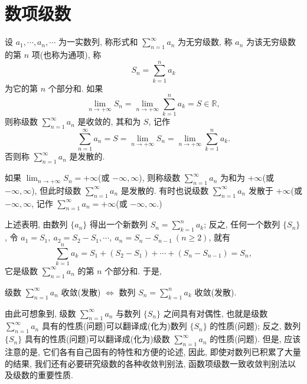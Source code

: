 \section{数项级数}\label{sec:12.1}

\begin{definition}[无穷级数与部分和]\label{def:12.1.1}
设 $a_{1}, \cdots, a_{n}, \cdots$ 为一实数列, 称形式和 $\sum_{n=1}^{\infty}a_{n}$ 为无穷级数, 称 $a_{n}$ 为该无穷级数的第 $n$ 项(也称为通项), 称
\[
  S_{n}=\sum_{k=1}^{n}a_{k}
\]
为它的第 $n$ 个部分和. 如果
\[
  \lim_{n\to+\infty}S_{n}=\lim_{n\to+\infty}\sum_{k=1}^{n}a_{k}=S\in\mathbb{R},
\]
则称级数 $\sum_{n=1}^{\infty}a_{n}$ 是收敛的, 其和为 $S$, 记作
\[
  \sum_{n=1}^{\infty}a_{n}=S=\lim_{n\to+\infty}S_{n}=\lim_{n\to+\infty}\sum_{k=1}^{n}a_{k}.
\]
否则称 $\sum_{n=1}^{\infty}a_{n}$ 是发散的.

如果 $\lim_{n\to+\infty}S_{n}=+\infty$(或 $-\infty,\infty$), 则称级数 $\sum_{n=1}^{\infty}a_{n}$ 为和为 $+\infty$(或 $-\infty,\infty$), 但此时级数 $\sum_{n=1}^{\infty}a_{n}$ 是发散的. 有时也说级数 $\sum_{n=1}^{\infty}a_{n}$ 发散于 $+\infty$(或 $-\infty,\infty$, 记作 $\sum_{n=1}^{\infty}a_{n}=+\infty$(或 $-\infty,\infty$.)
\end{definition}

上述表明, 由数列 $\{a_{n}\}$ 得出一个新数列 $S_{n}=\sum_{k=1}^{n}a_{k}$; 反之, 任何一个数列 $\{S_{n}\}$, 令 $a_{1}=S_{1},\ a_{2}=S_{2}-S_{1},\cdots,\ a_{n}=S_{n}-S_{n-1}\ (n\geqslant2)$, 就有
\[
  \sum_{k=1}^{n}a_{k}=S_{1}+(S_{2}-S_{1})+\cdots+(S_{n}-S_{n-1})=S_{n},
\]
它是级数 $\sum_{n=1}^{\infty}a_{n}$ 的第 $n$ 个部分和. 于是,
\begin{center}
级数 $\sum_{n=1}^{\infty}a_{n}$ 收敛(发散)
$\Leftrightarrow$ 数列 $S_{n}=\sum_{k=1}^{n}a_{k}$ 收敛(发散).
\end{center}

由此可想象到, 级数 $\sum_{n=1}^{\infty}a_{n}$ 与数列 $\{S_{n}\}$ 之间具有对偶性, 也就是级数 $\sum_{n=1}^{\infty}a_{n}$ 具有的性质(问题)可以翻译成(化为)数列 $\{S_{n}\}$ 的性质(问题); 反之, 数列 $\{S_{n}\}$ 具有的性质(问题)可以翻译成(化为)级数 $\sum_{n=1}^{\infty}a_{n}$ 的性质(问题). 但是, 应该注意的是, 它们各有自己固有的特性和方便的论述, 因此, 即使对数列已积累了大量的结果, 我们还有必要研究级数的各种收敛判别法, 函数项级数一致收敛判别法以及级数的重要性质.

